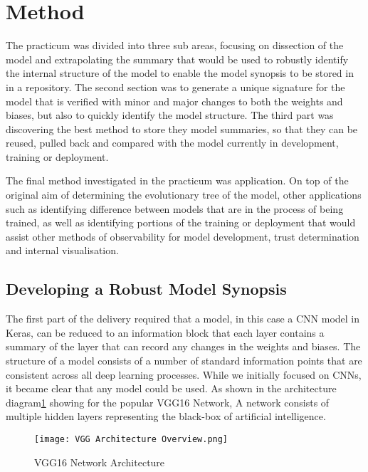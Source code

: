 \section{Method}

The practicum was divided into three sub areas, focusing on dissection of the model and extrapolating the summary that would be used to robustly identify the internal structure of the model to enable the model synopsis to be stored in in a repository. The second section was to generate a unique signature for the model that is verified with minor and major changes to both the weights and biases, but also to quickly identify the model structure. The third part was discovering the best method to store they model summaries, so that they can be reused, pulled back and compared with the model currently in development, training or deployment.

The final method investigated in the practicum was application. On top of the original aim of determining the evolutionary tree of the model, other applications such as identifying difference between models that are in the process of being trained, as well as identifying portions of the training or deployment that would assist other methods of observability for model development, trust determination and internal visualisation.

\subsection{Developing a Robust Model Synopsis}
The first part of the delivery required that a model, in this case a CNN model in Keras, can be reduced to an information block that each layer contains a summary of the layer that can record any changes in the weights and biases. The structure of a model consists of a number of standard information points that are consistent across all deep learning processes. While we initially focused on CNNs, it became clear that any model could be used. As shown in the architecture diagram\ref{fig:vgg16Architecture} showing for the popular VGG16 Network\cite{simonyan_deep_2014}, A network consists of multiple hidden layers representing the black-box of artificial intelligence.

\begin{figure}[!ht]
    \centering
    \texttt{[image: VGG Architecture Overview.png]}
    \caption{VGG16 Network Architecture}
    \label{fig:vgg16Architecture}
\end{figure}

